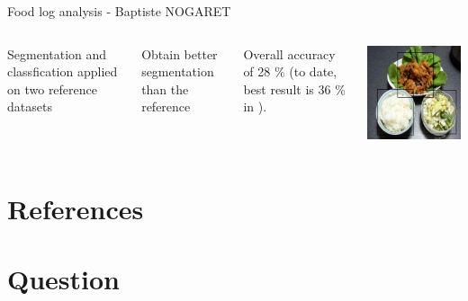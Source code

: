 \documentclass[aspectratio=169]{beamer}
\let\oldsection\section
\renewcommand{\section}[1]{
    \oldsection{#1}	
    \subsection{}
}
\newenvironment{myframe}[1][t]{\begin{frame}[#1]{\secname}{\subsecname}}{\end{frame}}
\begin{document}
    {
        \begin{frame}{Food log analysis - Baptiste NOGARET}{}
            \begin{columns}
                Segmentation and classfication applied on two reference datasets
                
                \vspace{0.5cm}
                
                Obtain better segmentation than the reference
                
                \vspace{0.5cm}
                
                Overall accuracy of 28 \% (to date, best result is 36 \% in \cite{Bolanos2016}).
                
                \centering
                \includegraphics[scale=0.5]{../img/seg_97_gt}
            \end{columns}
        \end{frame}
    }
    
    \section{References}
    
    \begin{myframe}[t, allowframebreaks]
        \printbibliography[heading=none]
    \end{myframe}
    
    \section{Question}
   
\end{document}

